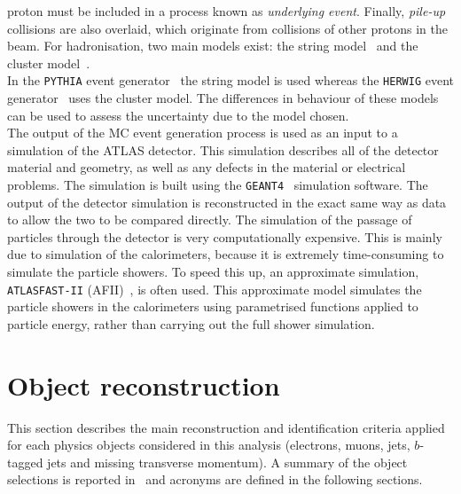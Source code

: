 proton must be included in a process known as \textit{underlying event}.
\newpage
\noindent Finally, \textit{pile-up} collisions are also overlaid, which originate from collisions of other
protons in the beam.
For hadronisation, two main models exist: the string model~\cite{string} and the cluster 
model~\cite{cluster}.\\ In the \texttt{PYTHIA} event generator~\cite{pythia} the string model is used 
whereas the \texttt{HERWIG} event generator~\cite{herwig} uses the cluster model. The 
differences in behaviour of these models can be used to assess the uncertainty due to the 
model chosen.\\
The output of the MC event generation process is used as an input to a simulation of the
ATLAS detector. This simulation describes all of the detector material and geometry, as
well as any defects in the material or electrical problems. The simulation is built using the
\texttt{GEANT4}~\cite{geant} simulation software.
The output of the detector simulation is reconstructed in the exact same way as data to allow the 
two to be compared directly.
The simulation of the passage of particles through the detector is very computationally expensive.
This is mainly due to simulation of the calorimeters, because it is extremely time-consuming
to simulate the particle showers. To speed this up, an approximate simulation, 
\texttt{ATLASFAST-II} (AFII)~\cite{afii}, is often used. This approximate model simulates the 
particle showers in the calorimeters using parametrised functions applied to particle energy, 
rather than carrying out the full shower simulation.
\FloatBarrier
\section{Object reconstruction}
This section describes the main reconstruction and identification criteria applied for each physics
objects considered in this analysis (electrons, muons, jets, $b$-tagged jets and missing transverse momentum). 
A summary of the object selections is reported in~ and acronyms are defined in the following sections. 

